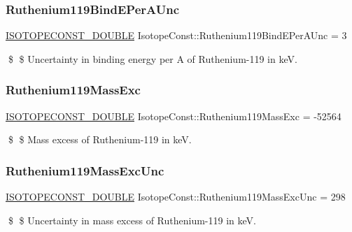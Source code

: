 \subsubsection{\texorpdfstring{Ruthenium119\+Bind\+E\+Per\+A\+Unc}{Ruthenium119BindEPerAUnc}}
{\footnotesize\ttfamily \mbox{\hyperlink{group___isotope_const-_macros_ga8f45a7272ce02c0b4c65c44636ed719a}{I\+S\+O\+T\+O\+P\+E\+C\+O\+N\+S\+T\+\_\+\+D\+O\+U\+B\+LE}} Isotope\+Const\+::\+Ruthenium119\+Bind\+E\+Per\+A\+Unc = 3}

\$ \$ Uncertainty in binding energy per A of Ruthenium-\/119 in keV. \mbox{\label{group___isotope_const-_ruthenium-_ru119_gaa2db3385f869ff87053affb1fabc8429}} 
\subsubsection{\texorpdfstring{Ruthenium119\+Mass\+Exc}{Ruthenium119MassExc}}
{\footnotesize\ttfamily \mbox{\hyperlink{group___isotope_const-_macros_ga8f45a7272ce02c0b4c65c44636ed719a}{I\+S\+O\+T\+O\+P\+E\+C\+O\+N\+S\+T\+\_\+\+D\+O\+U\+B\+LE}} Isotope\+Const\+::\+Ruthenium119\+Mass\+Exc = -\/52564}

\$ \$ Mass excess of Ruthenium-\/119 in keV. \mbox{\label{group___isotope_const-_ruthenium-_ru119_gab2d50c9f8eb3fade2b68a5cfe90af641}} 
\subsubsection{\texorpdfstring{Ruthenium119\+Mass\+Exc\+Unc}{Ruthenium119MassExcUnc}}
{\footnotesize\ttfamily \mbox{\hyperlink{group___isotope_const-_macros_ga8f45a7272ce02c0b4c65c44636ed719a}{I\+S\+O\+T\+O\+P\+E\+C\+O\+N\+S\+T\+\_\+\+D\+O\+U\+B\+LE}} Isotope\+Const\+::\+Ruthenium119\+Mass\+Exc\+Unc = 298}

\$ \$ Uncertainty in mass excess of Ruthenium-\/119 in keV. \mbox{\label{group___isotope_const-_ruthenium-_ru119_ga4dc067a95c359e6f1cb46297dcbf9ff6}} 
